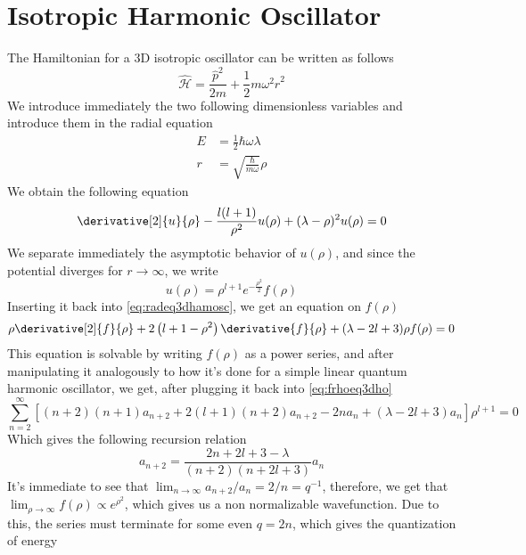 \documentclass[a4paper, 11pt]{book}
\newcommand{\1}{\opr{\mathds{1}}}
\newcommand{\ham}{\mathcal{H}}
\newcommand{\opr}[1]{\hat{#1}}
\theoremstyle{plain}
\begin{document}
	\section{Isotropic Harmonic Oscillator}
	The Hamiltonian for a 3D isotropic oscillator can be written as follows
	\begin{equation}
		\opr{\ham}=\frac{\opr{p}^2}{2m}+\frac{1}{2}m\omega^2\opr{r}^2
		\label{eq:3dharmosc}
	\end{equation}
	We introduce immediately the two following dimensionless variables and introduce them in the radial equation
	\begin{equation*}
		\begin{aligned}
			E&=\frac{1}{2}\hbar\omega\lambda\\
			r&=\sqrt{\frac{\hbar}{m\omega}}\rho
		\end{aligned}
	\end{equation*}
	We obtain the following equation
	\begin{equation}
		\derivative[2]{u}{\rho}-\frac{l(l+1)}{\rho^2}u(\rho)+(\lambda-\rho)^2u(\rho)=0
		\label{eq:radeq3dhamosc}
	\end{equation}
	We separate immediately the asymptotic behavior of $u(\rho)$, and since the potential diverges for $r\to\infty$, we write
	\begin{equation}
		u(\rho)=\rho^{l+1}e^{-\frac{\rho^2}{2}}f(\rho)
		\label{eq:asbehavior3darmosc}
	\end{equation}
	Inserting it back into \eqref{eq:radeq3dhamosc}, we get an equation on $f(\rho)$
	\begin{equation}
		\rho\derivative[2]{f}{\rho}+2\left( l+1-\rho^2 \right)\derivative{f}{\rho}+(\lambda-2l+3)\rho f(\rho)=0
		\label{eq:frhoeq3dho}
	\end{equation}
	This equation is solvable by writing $f(\rho)$ as a power series, and after manipulating it analogously to how it's done for a simple linear quantum harmonic oscillator, we get, after plugging it back into \eqref{eq:frhoeq3dho}
	\begin{equation}
		\sum_{n=2}^{\infty}\left[ (n+2)(n+1)a_{n+2}+2(l+1)(n+2)a_{n+2}-2na_n+(\lambda-2l+3)a_n \right]\rho^{l+1}=0
		\label{eq:frhosumrel}
	\end{equation}
	Which gives the following recursion relation
	\begin{equation}
		a_{n+2}=\frac{2n+2l+3-\lambda}{(n+2)(n+2l+3)}a_n
		\label{eq:recursionrel}
	\end{equation}
	It's immediate to see that $\lim_{n\to\infty}a_{n+2}/a_n=2/n=q^{-1}$, therefore, we get that $\lim_{\rho\to\infty}f(\rho)\propto e^{\rho^2}$, which gives us a non normalizable wavefunction. Due to this, the series must terminate for some even $q=2n$, which gives the quantization of energy
\end{document}
